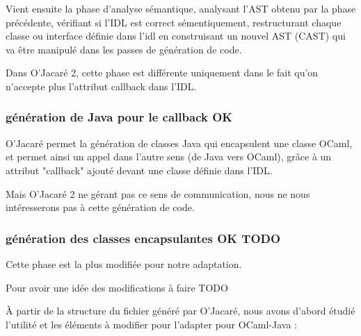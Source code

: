 \documentclass[a4paper, 11pt]{article}
\begin{document}
Vient ensuite la phase d'analyse sémantique, analysant l'AST obtenu par la
phase précédente, vérifiant si l'IDL est correct sémentiquement,
restructurant chaque classe ou interface définie dans l'idl en construisant un nouvel AST (CAST) qui va être manipulé dans les passes de génération de code.

Dans O'Jacaré 2, cette phase est différente uniquement dans le fait qu'on n'accepte plus l'attribut callback dans l'IDL. 

\subsubsection{génération de Java pour le callback OK}
O'Jacaré permet la génération de classes Java qui encapsulent une classe OCaml, et permet ainsi un appel dans l'autre sens (de Java vers OCaml), grâce à un attribut "callback" ajouté devant une classe définie dans l'IDL.

Mais O'Jacaré 2 ne gérant pas ce sens de communication, nous ne nous intéresserons pas à cette génération de code.

\subsubsection{génération des classes encapsulantes OK TODO}

Cette phase est la plus modifiée pour notre adaptation.

Pour avoir une idée des modifications à faire TODO

\`A partir de la structure du fichier généré par O'Jacaré, nous avons d'abord étudié l'utilité et les éléments à modifier pour l'adapter pour OCaml-Java :
\end{document}

